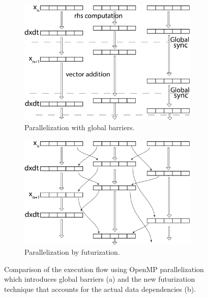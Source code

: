 \documentclass[10pt]{elsarticle}
\begin{document}
\begin{figure}
 \begin{subfigure}[b]{0.49\textwidth}
  \centering
  \includegraphics[width=0.95\textwidth]{par_global.pdf}
  \caption{Parallelization with global barriers.}
  \label{fig:par_glob_bar}
 \end{subfigure}\vline
 \begin{subfigure}[b]{0.49\textwidth}
  \centering
  \includegraphics[width=0.95\textwidth]{par_dfo.pdf}\vspace{1em}
  \caption{Parallelization by futurization.}
  \label{fig:par_fut}
 \end{subfigure}
 \caption{Comparison of the execution flow using OpenMP parallelization which introduces global barriers (a) and the new futurization technique that accounts for the actual data dependencies (b).} 
 \label{fig:parallelization}
\end{figure}
\end{document}
